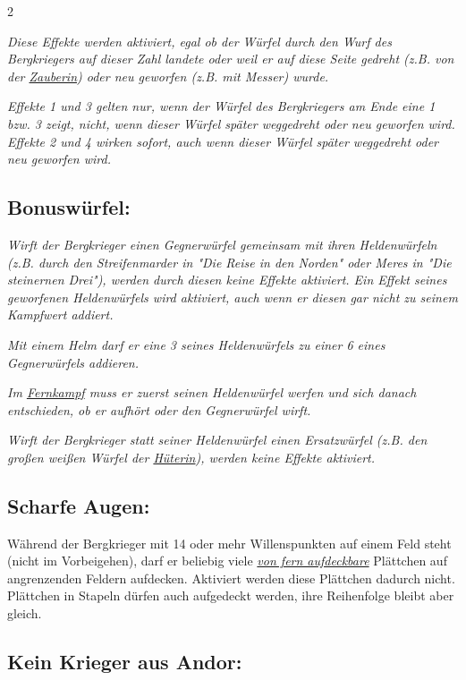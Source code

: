 \documentclass[10pt, a4paper, oneside]{book}
\newcommand{\fan}[1]{\textit{#1}}
\begin{document}
\begin{multicols*}{2}
\begin{nobgcolor}
\fan{Diese Effekte werden aktiviert, egal ob der Würfel durch den Wurf des Bergkriegers auf dieser Zahl landete oder weil er auf diese Seite gedreht (z.B. von der \hyperref[zauberin]{Zauberin}) oder neu geworfen (z.B. mit Messer) wurde.}

\fan{Effekte 1 und 3 gelten nur, wenn der Würfel des Bergkriegers am Ende eine 1 bzw. 3 zeigt, nicht, wenn dieser Würfel später weggedreht oder neu geworfen wird. Effekte 2 und 4 wirken sofort, auch wenn dieser Würfel später weggedreht oder neu geworfen wird.}





\subsection{Bonuswürfel:}


\fan{Wirft der Bergkrieger einen Gegnerwürfel gemeinsam mit ihren Heldenwürfeln (z.B. durch den Streifenmarder in "Die Reise in den Norden" oder Meres in "Die steinernen Drei"), werden durch diesen keine Effekte aktiviert. Ein Effekt seines geworfenen Heldenwürfels wird aktiviert, auch wenn er diesen gar nicht zu seinem Kampfwert addiert.}

\fan{Mit einem Helm darf er eine 3 seines Heldenwürfels zu einer 6 eines Gegnerwürfels addieren.}

\fan{Im \hyperref[fernkaempfer]{Fernkampf} muss er zuerst seinen Heldenwürfel werfen und sich danach entschieden, ob er aufhört oder den Gegnerwürfel wirft.}

\fan{Wirft der Bergkrieger statt seiner Heldenwürfel einen Ersatzwürfel (z.B. den großen weißen Würfel der \hyperref[hueterin]{Hüterin}), werden keine Effekte aktiviert.}



\columnbreak

\subsection{Scharfe Augen:}

Während der Bergkrieger mit 14 oder mehr Willenspunkten auf einem Feld steht (nicht im Vorbeigehen), darf er beliebig viele \hyperref[aufdecken]{\fan{von fern aufdeckbare}} Plättchen auf angrenzenden Feldern aufdecken. Aktiviert werden diese Plättchen dadurch nicht. Plättchen in Stapeln dürfen auch aufgedeckt werden, ihre Reihenfolge bleibt aber gleich.
\supercite{bl-bdm-a3-en}


\subsection{Kein Krieger aus Andor:}


\end{nobgcolor}
\end{multicols*}
\end{document}
